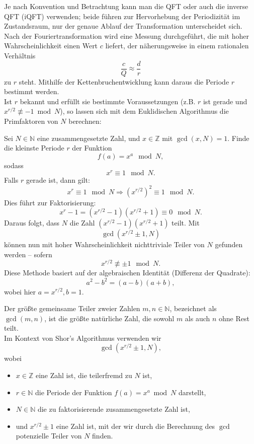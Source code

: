 Je nach Konvention und Betrachtung kann man die QFT oder auch die inverse QFT (iQFT) verwenden; beide führen zur Hervorhebung der Periodizität im Zustandsraum, nur der genaue Ablauf der Transformation unterscheidet sich.\\

Nach der Fouriertransformation wird eine Messung durchgeführt, die mit hoher Wahrscheinlichkeit einen Wert \( c \) liefert, der näherungsweise in einem rationalen Verhältnis  
\[
\frac{c}{Q} \approx \frac{d}{r}
\]
zu \( r \) steht. Mithilfe der Kettenbruchentwicklung kann daraus die Periode \( r \) bestimmt werden.\\

Ist \( r \) bekannt und erfüllt sie bestimmte Voraussetzungen (z.B. \( r \) ist gerade und \( x^{r/2} \not\equiv -1 \bmod N \)), so lassen sich mit dem Euklidischen Algorithmus die Primfaktoren von \( N \) berechnen: 

Sei \( N \in \mathbb{N} \) eine zusammengesetzte Zahl, und \( x \in \mathbb{Z} \) mit \(\gcd(x, N) = 1\).  
Finde die kleinste Periode \( r \) der Funktion
\[
f(a) = x^a \mod N,
\]
sodass
\[
x^r \equiv 1 \mod N.
\]
Falls \( r \) gerade ist, dann gilt:
\[
x^r \equiv 1 \mod N \Rightarrow (x^{r/2})^2 \equiv 1 \mod N.
\]
Dies führt zur Faktorisierung:
\[
x^r - 1 = (x^{r/2} - 1)(x^{r/2} + 1) \equiv 0 \mod N.
\]
Daraus folgt, dass \( N \) die Zahl \( (x^{r/2} - 1)(x^{r/2} + 1) \) teilt.
Mit
\[
\gcd(x^{r/2} \pm 1, N)
\]
können nun mit hoher Wahrscheinlichkeit nichttriviale Teiler von \( N \) gefunden werden – sofern
\[
x^{r/2} \not\equiv \pm 1 \mod N.
\]
Diese Methode basiert auf der algebraischen Identität (Differenz der Quadrate):
\[
a^2 - b^2 = (a - b)(a + b),
\]
wobei hier \( a = x^{r/2}, b = 1 \).

\begin{definition}
Der größte gemeinsame Teiler zweier Zahlen \(m, n \in \mathbb{N}\), bezeichnet als \(\gcd(m,n)\), ist die größte natürliche Zahl, die sowohl \(m\) als auch \(n\) ohne Rest teilt.\\

Im Kontext von Shor's Algorithmus verwenden wir
\[
\gcd\left(x^{r/2} \pm 1, N\right),
\]
wobei
\begin{itemize}
    \item \(x \in \mathbb{Z}\) eine Zahl ist, die teilerfremd zu \(N\) ist,
    \item \(r \in \mathbb{N}\) die Periode der Funktion \(f(a) = x^a \bmod N\) darstellt,
    \item \(N \in \mathbb{N}\) die zu faktorisierende zusammengesetzte Zahl ist,
    \item und \(x^{r/2} \pm 1\) eine Zahl ist, mit der wir durch die Berechnung des \(\gcd\) potenzielle Teiler von \(N\) finden.
\end{itemize}
\end{definition}

